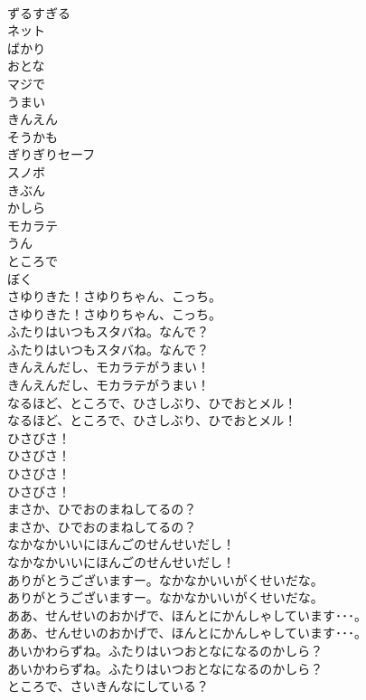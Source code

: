 \documentclass[8pt]{extreport}
\begin{document}
\begin{CJK}{UTF8}{min}
\\	ずるすぎる
\\	ネット
\\	ばかり
\\	おとな
\\	マジで
\\	うまい
\\	きんえん
\\	そうかも
\\	ぎりぎりセーフ
\\	スノボ
\\	きぶん
\\	かしら
\\	モカラテ
\\	うん
\\	ところで
\\	ぼく
\\	さゆりきた！さゆりちゃん、こっち。
\\	さゆりきた！さゆりちゃん、こっち。
\\	ふたりはいつもスタバね。なんで？
\\	ふたりはいつもスタバね。なんで？
\\	きんえんだし、モカラテがうまい！
\\	きんえんだし、モカラテがうまい！
\\	なるほど、ところで、ひさしぶり、ひでおとメル！
\\	なるほど、ところで、ひさしぶり、ひでおとメル！
\\	ひさびさ！
\\	ひさびさ！
\\	ひさびさ！
\\	ひさびさ！
\\	まさか、ひでおのまねしてるの？
\\	まさか、ひでおのまねしてるの？
\\	なかなかいいにほんごのせんせいだし！
\\	なかなかいいにほんごのせんせいだし！
\\	ありがとうございますー。なかなかいいがくせいだな。
\\	ありがとうございますー。なかなかいいがくせいだな。
\\	ああ、せんせいのおかげで、ほんとにかんしゃしています･･･。
\\	ああ、せんせいのおかげで、ほんとにかんしゃしています･･･。
\\	あいかわらずね。ふたりはいつおとなになるのかしら？
\\	あいかわらずね。ふたりはいつおとなになるのかしら？
\\	ところで、さいきんなにしている？

\end{CJK}
\end{document}
